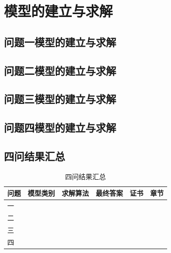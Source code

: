 %
\section{模型的建立与求解}

\subsection{问题一模型的建立与求解}



\subsection{问题二模型的建立与求解}



\subsection{问题三模型的建立与求解}



\subsection{问题四模型的建立与求解}



\subsection{四问结果汇总}
\begin{table}[htbp]
  \centering
  \caption{四问结果汇总}
  \label{tab:summary}
  \begin{tabularx}{\linewidth}{lXXlXl}
    \toprule
    问题 & 模型类别 & 求解算法 & 最终答案 & 证书 & 章节 \\
    \midrule
    一 &  &  &  &  &  \\
    二 &  &  &  &  &  \\
    三 &  &  &  &  &  \\
    四 &  &  &  &  &  \\
    \bottomrule
  \end{tabularx}
\end{table}
